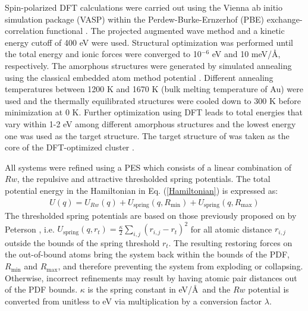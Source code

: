 Spin-polarized  DFT calculations were carried out using the Vienna ab initio simulation package (VASP) \cite{Kresse1993, Kresse1994} within the  Perdew-Burke-Ernzerhof (PBE) exchange-correlation functional \cite{PERD1996}.
The projected augmented wave method \cite{Blochl1994} and a kinetic energy cutoff of 400 eV were used.
Structural optimization was performed until the total energy and ionic forces were converged to 10$^{-6}$ eV and 10 meV/\AA, respectively.
The  amorphous  structures were generated by simulated annealing using the classical embedded atom method potential \cite{Sheng2011}.
Different annealing temperatures between 1200 K and 1670 K (bulk melting temperature of Au) were used and the thermally equilibrated structures were cooled down to 300 K before minimization at 0 K.
Further optimization using DFT leads to total energies that vary within 1-2 eV among different amorphous structures  and the lowest energy one was used as the target structure. The target structure of  was taken as the  core of the DFT-optimized  cluster \cite{Li2008}.

All systems were refined using a PES  which consists of a linear combination of $Rw$, the repulsive and attractive thresholded spring potentials.  The total potential energy in the Hamiltonian in Eq. (\ref{Hamiltonian}) is expressed as:
\begin{eqnarray}\label{eq:Ucomp}
  U(q) = U_{Rw}(q) + U_\mathrm{spring}(q, R_\mathrm{min}) + U_\mathrm{spring}(q, R_\mathrm{max})
\end{eqnarray}
The thresholded spring potentials are based on those previously proposed on by Peterson \cite{Peterson2014}, i.e.  $U_\mathrm{spring}(q, r_{t}) = \frac{\kappa}{2}\sum_{i, j}(r_{i, j}-r_t)^{2}$  for all atomic distance $r_{i,j}$  outside the bounds of the spring threshold $r_t$.
The resulting restoring forces on the out-of-bound atoms  bring the system back within the bounds of the PDF, $R_\mathrm{min}$ and $R_\mathrm{max}$, and therefore preventing the system from exploding or collapsing.
Otherwise,  incorrect refinements may result by having atomic pair distances out of the PDF bounds.  $\kappa$ is the spring constant in eV/\AA~and the $Rw$ potential is converted from unitless to eV via multiplication by a conversion factor $\lambda$.

